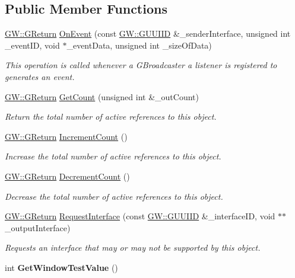 \subsection*{Public Member Functions}
\begin{DoxyCompactItemize}
\item 
\hyperlink{namespaceGW_a67a839e3df7ea8a5c5686613a7a3de21}{G\+W\+::\+G\+Return} \hyperlink{classTestListener_a9699393edd72eb3b9edf0a127bef04d6}{On\+Event} (const \hyperlink{structGW_1_1GUUIID}{G\+W\+::\+G\+U\+U\+I\+ID} \&\+\_\+sender\+Interface, unsigned int \+\_\+event\+ID, void $\ast$\+\_\+event\+Data, unsigned int \+\_\+size\+Of\+Data)
\begin{DoxyCompactList}\small\item\em This operation is called whenever a G\+Broadcaster a listener is registered to generates an event. \end{DoxyCompactList}\item 
\hyperlink{namespaceGW_a67a839e3df7ea8a5c5686613a7a3de21}{G\+W\+::\+G\+Return} \hyperlink{classTestListener_adf2cf4429220c8ec7b48bf330e209a2f}{Get\+Count} (unsigned int \&\+\_\+out\+Count)
\begin{DoxyCompactList}\small\item\em Return the total number of active references to this object. \end{DoxyCompactList}\item 
\hyperlink{namespaceGW_a67a839e3df7ea8a5c5686613a7a3de21}{G\+W\+::\+G\+Return} \hyperlink{classTestListener_a21d8210efa2a1085e5cbd8dc72e3760c}{Increment\+Count} ()
\begin{DoxyCompactList}\small\item\em Increase the total number of active references to this object. \end{DoxyCompactList}\item 
\hyperlink{namespaceGW_a67a839e3df7ea8a5c5686613a7a3de21}{G\+W\+::\+G\+Return} \hyperlink{classTestListener_a0f27793f8d7ec64b7e5861048a03c9f8}{Decrement\+Count} ()
\begin{DoxyCompactList}\small\item\em Decrease the total number of active references to this object. \end{DoxyCompactList}\item 
\hyperlink{namespaceGW_a67a839e3df7ea8a5c5686613a7a3de21}{G\+W\+::\+G\+Return} \hyperlink{classTestListener_a91a944c0314ad6acba3a2fce5a144512}{Request\+Interface} (const \hyperlink{structGW_1_1GUUIID}{G\+W\+::\+G\+U\+U\+I\+ID} \&\+\_\+interface\+ID, void $\ast$$\ast$\+\_\+output\+Interface)
\begin{DoxyCompactList}\small\item\em Requests an interface that may or may not be supported by this object. \end{DoxyCompactList}\item 
int {\bfseries Get\+Window\+Test\+Value} ()\hypertarget{classTestListener_a54ed6cbe2c49e64118a3374ae12d4c84}{}\label{classTestListener_a54ed6cbe2c49e64118a3374ae12d4c84}

\end{DoxyCompactItemize}


